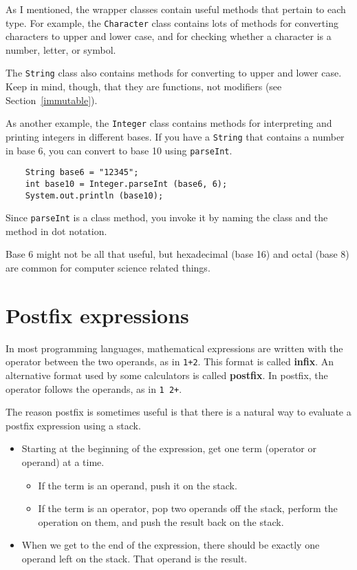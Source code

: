As I mentioned, the wrapper classes contain useful methods that
pertain to each type.  For example, the {\tt Character} class contains
lots of methods for converting characters to upper and lower case, and
for checking whether a character is a number, letter, or symbol.

The {\tt String} class also contains methods for converting to upper
and lower case.  Keep in mind, though, that they are functions,
not modifiers (see Section~\ref{immutable}).

As another example, the {\tt Integer} class contains methods for
interpreting and printing integers in different bases.  If you have a
{\tt String} that contains a number in base 6, you can convert to base
10 using {\tt parseInt}.

\begin{verbatim}
    String base6 = "12345";
    int base10 = Integer.parseInt (base6, 6);
    System.out.println (base10);
\end{verbatim}
%
Since {\tt parseInt} is a class method, you invoke it by
naming the class and the method in dot notation.

Base 6 might not be all that useful, but hexadecimal
(base 16) and octal (base 8) are common for computer science
related things.


\section {Postfix expressions}

In most programming languages, mathematical expressions are
written with the operator between the two operands, as in
{\tt 1+2}.  This format is called {\bf infix}.  An alternative
format used by some calculators is called {\bf postfix}.  In
postfix, the operator follows the operands, as in {\tt 1 2+}.

The reason postfix is sometimes useful is that there is a
natural way to evaluate a postfix expression using a stack.

\begin{itemize}

\item Starting at the beginning of the expression, get one
term (operator or operand) at a time.

	\begin{itemize}

	\item If the term is an operand, push it on the stack.

	\item If the term is an operator, pop two operands off
	the stack, perform the operation on them, and push the
	result back on the stack.

	\end{itemize}

\item When we get to the end of the expression, there should
be exactly one operand left on the stack.  That operand is the
result.

\end{itemize}

